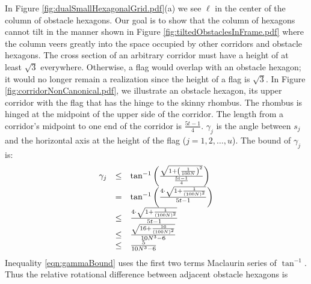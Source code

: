 In Figure \ref{fig:dualSmallHexagonalGrid.pdf}(a) we see $\ell$ in the center of the column of obstacle hexagons.  
Our goal is to show that the column of hexagons cannot tilt in the manner shown in Figure \ref{fig:tiltedObstaclesInFrame.pdf} where the column veers greatly into the space occupied by other corridors and obstacle hexagons.
The cross section of an arbitrary corridor must have a height of at least $\sqrt{3}$ everywhere. 
Otherwise, a flag would overlap with an obstacle hexagon; it would no longer remain a realization since the height of a flag is $\sqrt{3}$.
In Figure \ref{fig:corridorNonCanonical.pdf}, we illustrate an obstacle hexagon, its upper corridor with the flag that has the hinge to the skinny rhombus.  
The rhombus is hinged at the midpoint of the upper side of the corridor.
The length from a corridor's midpoint to one end of the corridor is $\frac{5t-1}{4}$.
$\gamma_j$ is the angle between $s_j$ and the horizontal axis at the height of the flag ($j = 1,2,\ldots, u$).
The bound of $\gamma_j$ is:
\begin{equation}\label{eqn:gammaBound}
\begin{array}{rcl}
\gamma_j &\leq & \tan^{-1} \left( 
								\frac{
										\sqrt{1+ \left( 	\frac{1}{100N}	 \right)^2}
								}{
										\frac{5t-1}{4}
								}	
							 \right)\\
&=& \tan^{-1} \left( \frac{4\cdot \sqrt{1 + \frac{1}{(100N)^2}}}{5t-1} \right)\\
&\leq& \frac{4\cdot \sqrt{1 + \frac{1}{(100N)^2}}}{5t-1}\\
&\leq& \frac{\sqrt{16 + \frac{16}{(100N)^2}}}{10N^3 -6}\\
&\leq& \frac{5}{10N^3 -6}
\end{array} 
\end{equation}
Inequality \ref{eqn:gammaBound} uses the first two terms Maclaurin series of $\tan^{-1}$.
Thus the relative rotational difference between adjacent obstacle hexagons is
